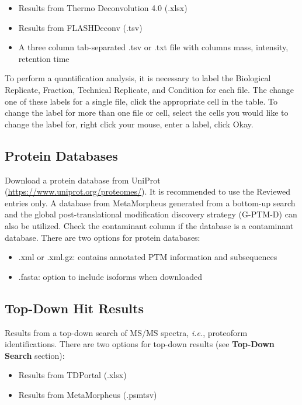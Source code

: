 \begin{itemize}
	\item Results from Thermo Deconvolution 4.0 (.xlsx)
	\item Results from FLASHDeconv (.tsv)
	\item A three column tab-separated .tsv or .txt file with columns mass, intensity, retention time
\end{itemize}

To perform a quantification analysis, it is necessary to label the Biological Replicate, Fraction, Technical Replicate, and Condition for each file. The change one of these labels for a single file, click the appropriate cell in the table. To change the label for more than one file or cell, select the cells you would like to change the label for, right click your mouse, enter a label, click Okay. 

\subsection{Protein Databases}

Download a protein database from UniProt (\url{https://www.uniprot.org/proteomes/}). It is recommended to use the Reviewed entries only. A database from MetaMorpheus generated from a bottom-up search and the global post-translational modification discovery strategy (G-PTM-D) can also be utilized.\supercite{Dai2017,Dai2019} Check the contaminant column if the database is a contaminant database. There are two options for protein databases:
\begin{itemize}
\item .xml or .xml.gz: contains annotated PTM information and subsequences
\item .fasta: option to include isoforms when downloaded
\end{itemize}

\subsection{Top-Down Hit Results}

Results from a top-down search of MS/MS spectra, \textit{i.e.}, proteoform identifications. There are two options for top-down results (see \textbf{Top-Down Search} section):
\begin{itemize}
	\item Results from TDPortal (.xlsx)
	\item Results from MetaMorpheus (.psmtsv)
\end{itemize} 

